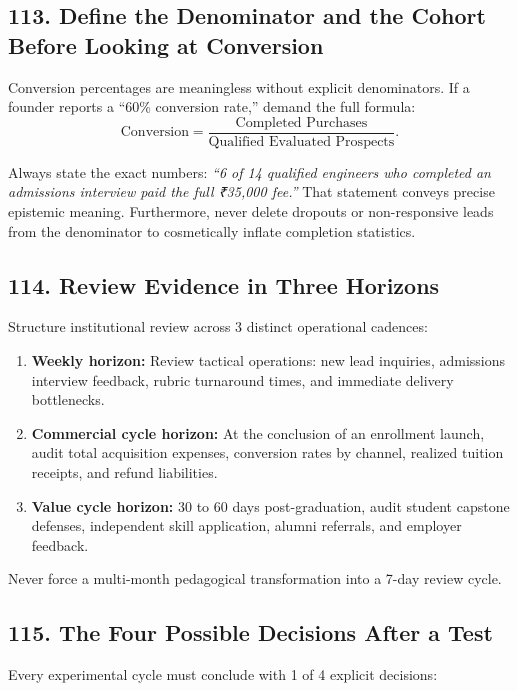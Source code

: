 \subsection*{113. Define the Denominator and the Cohort Before Looking at Conversion}

Conversion percentages are meaningless without explicit denominators. If a founder reports a ``60\% conversion rate,'' demand the full formula:
\begin{equation}
\text{Conversion} = \frac{\text{Completed Purchases}}{\text{Qualified Evaluated Prospects}}.
\end{equation}

Always state the exact numbers: \emph{``6 of 14 qualified engineers who completed an admissions interview paid the full ₹35,000 fee.''} That statement conveys precise epistemic meaning. Furthermore, never delete dropouts or non-responsive leads from the denominator to cosmetically inflate completion statistics.

\subsection*{114. Review Evidence in Three Horizons}

Structure institutional review across 3 distinct operational cadences:
\begin{enumerate}
    \item \textbf{Weekly horizon:} Review tactical operations: new lead inquiries, admissions interview feedback, rubric turnaround times, and immediate delivery bottlenecks.
    \item \textbf{Commercial cycle horizon:} At the conclusion of an enrollment launch, audit total acquisition expenses, conversion rates by channel, realized tuition receipts, and refund liabilities.
    \item \textbf{Value cycle horizon:} 30 to 60 days post-graduation, audit student capstone defenses, independent skill application, alumni referrals, and employer feedback.
\end{enumerate}

Never force a multi-month pedagogical transformation into a 7-day review cycle.

\subsection*{115. The Four Possible Decisions After a Test}

Every experimental cycle must conclude with 1 of 4 explicit decisions:

